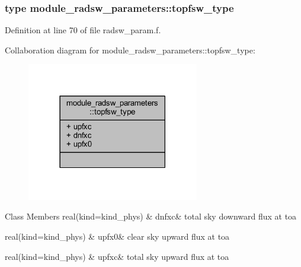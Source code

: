 \subsubsection{type module\+\_\+radsw\+\_\+parameters\+:\+:topfsw\+\_\+type}


Definition at line 70 of file radsw\+\_\+param.\+f.



Collaboration diagram for module\+\_\+radsw\+\_\+parameters\+:\+:topfsw\+\_\+type\+:\nopagebreak
\begin{figure}[H]
\begin{center}
\leavevmode
\includegraphics[width=213pt]{structmodule__radsw__parameters_1_1topfsw__type__coll__graph}
\end{center}
\end{figure}
\begin{DoxyFields}{Class Members}
real(kind=kind\+\_\+phys)\hypertarget{namespacemodule__radsw__parameters_ac1466bb6a9da92a59bdef51439320f35}{}\label{namespacemodule__radsw__parameters_ac1466bb6a9da92a59bdef51439320f35}
&
dnfxc&
total sky downward flux at toa \\
\hline

real(kind=kind\+\_\+phys)\hypertarget{namespacemodule__radsw__parameters_a992c82c935dcb4d6269c905fc184cf48}{}\label{namespacemodule__radsw__parameters_a992c82c935dcb4d6269c905fc184cf48}
&
upfx0&
clear sky upward flux at toa \\
\hline

real(kind=kind\+\_\+phys)\hypertarget{namespacemodule__radsw__parameters_a444a7fd67ff2c22403779a5e83eef09b}{}\label{namespacemodule__radsw__parameters_a444a7fd67ff2c22403779a5e83eef09b}
&
upfxc&
total sky upward flux at toa \\
\hline

\end{DoxyFields}
\label{structmodule__radsw__parameters_1_1sfcfsw__type}
\hypertarget{namespacemodule__radsw__parameters_structmodule__radsw__parameters_1_1sfcfsw__type}{}
